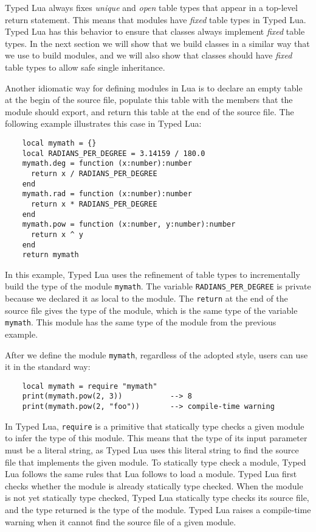 Typed Lua always fixes \emph{unique} and \emph{open} table types
that appear in a top-level return statement.
This means that modules have \emph{fixed} table types in Typed Lua.
Typed Lua has this behavior to ensure that classes always implement
\emph{fixed} table types.
In the next section we will show that we build classes in a
similar way that we use to build modules, and we will also show
that classes should have \emph{fixed} table types to allow safe
single inheritance.

Another idiomatic way for defining modules in Lua is to declare an
empty table at the begin of the source file,
populate this table with the members that the module should export,
and return this table at the end of the source file. 
The following example illustrates this case in Typed Lua:
\begin{verbatim}
    local mymath = {}
    local RADIANS_PER_DEGREE = 3.14159 / 180.0
    mymath.deg = function (x:number):number
      return x / RADIANS_PER_DEGREE
    end
    mymath.rad = function (x:number):number
      return x * RADIANS_PER_DEGREE
    end
    mymath.pow = function (x:number, y:number):number
      return x ^ y
    end
    return mymath
\end{verbatim}

In this example, Typed Lua uses the refinement of table types to
incrementally build the type of the module \texttt{mymath}.
The variable \texttt{RADIANS\string_PER\string_DEGREE}
is private because we declared it as local to the module. 
The \texttt{return} at the end of the source file gives the
type of the module, which is the same type of the variable \texttt{mymath}.
This module has the same type of the module from the previous example.

After we define the module \texttt{mymath}, regardless of the adopted style,
users can use it in the standard way:
\begin{verbatim}
    local mymath = require "mymath"
    print(mymath.pow(2, 3))           --> 8
    print(mymath.pow(2, "foo"))       --> compile-time warning
\end{verbatim}

In Typed Lua, \texttt{require} is a primitive that statically type checks
a given module to infer the type of this module.
This means that the type of its input parameter must be a literal string,
as Typed Lua uses this literal string to find the source file that
implements the given module.
To statically type check a module, Typed Lua follows the same rules
that Lua follows to load a module.
Typed Lua first checks whether the module is already statically type checked.
When the module is not yet statically type checked, Typed Lua
statically type checks its source file, and the type returned is the
type of the module.
Typed Lua raises a compile-time warning when it cannot find the source
file of a given module.

